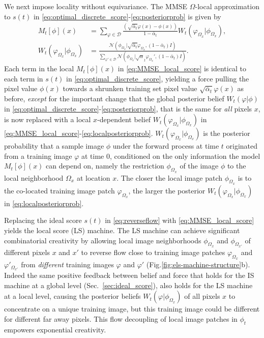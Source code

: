 \documentclass{article}
\theoremstyle{plain}
\theoremstyle{definition}
\theoremstyle{remark}
\begin{document}
We next impose locality without equivariance. The MMSE $\Omega$-local approximation to $s(t)$ in \eqref{eq:optimal_discrete_score}-\eqref{eq:posteriorprob} is given by
\begin{align}
    \label{eq:MMSE_local_score}
    M_t[\phi](x) &= \sum_{\varphi \in \mathcal{D}} \frac{( \sqrt{\bar{\alpha}_t} \varphi(x)- \phi(x))}{1 - \bar{\alpha}_t}W_t(\varphi_{\Omega_x}|\phi_{\Omega_x}),\\
    \label{eq:localposteriorprob}
    W_t(\varphi_{\Omega_x}|\phi_{\Omega_x}) &= \frac{\mathcal{N}(\phi_{\Omega_x}|\sqrt{\bar{\alpha}_t} \varphi_{\Omega_x}, (1 - \bar{\alpha}_t)I)}{\sum_{\varphi'\in \mathcal{D}} \mathcal{N}(\phi_{\Omega_x}|{\sqrt{\alpha}_t} \varphi_{\Omega_x}', (1 - \bar{\alpha}_t)I)}.
\end{align}
Each term in the local $M_t[\phi](x)$ in \eqref{eq:MMSE_local_score} is identical to each term in $s(t)$ in \eqref{eq:optimal_discrete_score}, yielding a force pulling the pixel value $\phi(x)$ towards a shrunken training set pixel value $\sqrt{\bar{\alpha}_t} \varphi(x)$ as before, {\it except} for the important change that the global posterior belief $W_t(\varphi|\phi)$ in \eqref{eq:optimal_discrete_score}-\eqref{eq:posteriorprob}, that is the same for {\it all} pixels $x$, is now replaced with a local $x$-dependent belief $W_t(\varphi_{\Omega_x}|\phi_{\Omega_x})$ in \eqref{eq:MMSE_local_score}-\eqref{eq:localposteriorprob}. $W_t(\varphi_{\Omega_x}|\phi_{\Omega_x})$ is the posterior probability that a sample image $\phi$ under the forward process at time $t$ originated from a training image $\varphi$ at time $0$, conditioned on the only information the model $M_t[\phi](x)$ can depend on, namely the restriction $\phi_{\Omega_x}$ of the image $\phi$ to the local neighborhood $\Omega_x$ at location $x$. The closer the local image patch $\phi_{\Omega_x}$ is to the co-located training image patch $\varphi_{\Omega_x}$, the larger the posterior $W_t(\varphi_{\Omega_x}|\phi_{\Omega_x})$ in \eqref{eq:localposteriorprob}.  

Replacing the ideal score $s(t)$ in \eqref{eq:reverseflow} with \eqref{eq:MMSE_local_score} yields the local score (LS) machine. The LS machine can achieve significant combinatorial creativity by allowing local image neighborhoods $\phi_{\Omega_x}$ and $\phi_{\Omega_{x'}}$ of different pixels $x$ and $x'$ to reverse flow close to training image patches $\varphi_{\Omega_x}$ and $\varphi'_{\Omega_{x'}}$ from {\it different} training images $\varphi$ and $\varphi'$ (Fig.\ref{fig:els-machine-structure}b).  Indeed the same positive feedback between belief and force that holds for the IS machine at a global level (Sec.~\ref{sec:ideal_score}), also holds for the LS machine at a local level, causing the posterior beliefs $W_t(\varphi|\phi_{\Omega_x})$ of all pixels $x$ to concentrate on a unique training image, but this training image could be different for different far away pixels. This flow decoupling of local image patches in $\phi_t$ empowers exponential creativity.  
\end{document}
